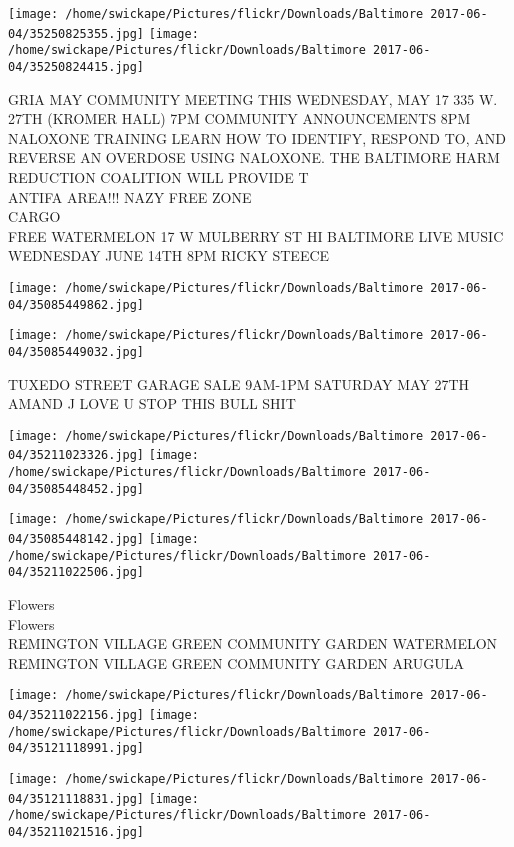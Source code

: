 \documentclass[10pt,letterpaper]{article}
\begin{document}
\texttt{[image: /home/swickape/Pictures/flickr/Downloads/Baltimore 2017-06-04/35250825355.jpg]}
\texttt{[image: /home/swickape/Pictures/flickr/Downloads/Baltimore 2017-06-04/35250824415.jpg]}

GRIA MAY COMMUNITY MEETING THIS WEDNESDAY, MAY 17 335 W. 27TH (KROMER HALL) 7PM COMMUNITY ANNOUNCEMENTS 8PM NALOXONE TRAINING LEARN HOW TO IDENTIFY, RESPOND TO, AND REVERSE AN OVERDOSE USING NALOXONE.  THE BALTIMORE HARM REDUCTION COALITION WILL PROVIDE T\\
ANTIFA AREA!!! NAZY FREE ZONE\\
CARGO\\
FREE WATERMELON 17 W MULBERRY ST HI BALTIMORE LIVE MUSIC WEDNESDAY JUNE 14TH 8PM RICKY STEECE\\
\pagebreak

\texttt{[image: /home/swickape/Pictures/flickr/Downloads/Baltimore 2017-06-04/35085449862.jpg]}

\vspace{0.25in}
\texttt{[image: /home/swickape/Pictures/flickr/Downloads/Baltimore 2017-06-04/35085449032.jpg]}

TUXEDO STREET GARAGE SALE 9AM{-}1PM SATURDAY MAY 27TH\\
AMAND J LOVE U STOP THIS BULL SHIT\\
\pagebreak

\texttt{[image: /home/swickape/Pictures/flickr/Downloads/Baltimore 2017-06-04/35211023326.jpg]}
\texttt{[image: /home/swickape/Pictures/flickr/Downloads/Baltimore 2017-06-04/35085448452.jpg]}

\texttt{[image: /home/swickape/Pictures/flickr/Downloads/Baltimore 2017-06-04/35085448142.jpg]}
\texttt{[image: /home/swickape/Pictures/flickr/Downloads/Baltimore 2017-06-04/35211022506.jpg]}

Flowers\\
Flowers\\
REMINGTON VILLAGE GREEN COMMUNITY GARDEN WATERMELON\\
REMINGTON VILLAGE GREEN COMMUNITY GARDEN ARUGULA\\
\pagebreak

\texttt{[image: /home/swickape/Pictures/flickr/Downloads/Baltimore 2017-06-04/35211022156.jpg]}
\texttt{[image: /home/swickape/Pictures/flickr/Downloads/Baltimore 2017-06-04/35121118991.jpg]}

\texttt{[image: /home/swickape/Pictures/flickr/Downloads/Baltimore 2017-06-04/35121118831.jpg]}
\texttt{[image: /home/swickape/Pictures/flickr/Downloads/Baltimore 2017-06-04/35211021516.jpg]}
\end{document}
